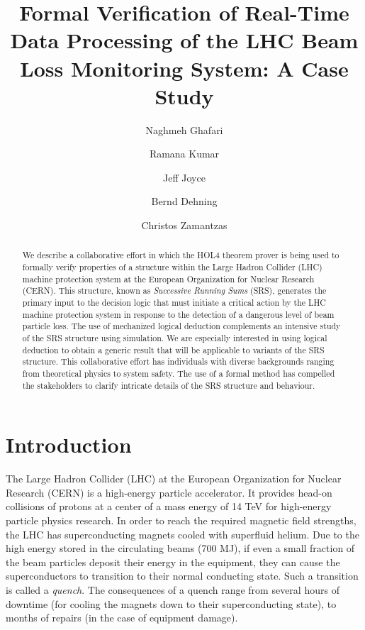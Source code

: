 \documentclass{llncs}
\begin{document}
\thispagestyle{empty}
\title{Formal Verification of Real-Time Data Processing of the LHC Beam Loss Monitoring System: A Case Study}
\author{Naghmeh Ghafari  \and Ramana Kumar  \and Jeff Joyce 
  \and Bernd Dehning  \and Christos Zamantzas  }

\pagestyle{plain}

\maketitle

\begin{abstract}

We describe a collaborative effort in which the HOL4 theorem prover is being used to formally verify properties of a structure within the Large Hadron Collider (LHC) machine protection system at the European Organization for Nuclear Research (CERN).
This structure, known as \emph{Successive Running Sums} (SRS), generates the primary input to the decision logic that must initiate a critical action by the LHC machine protection system in response to the detection of a dangerous level of beam particle loss.
The use of mechanized logical deduction complements an intensive study of the SRS structure using simulation.
We are especially interested in using logical deduction to obtain a generic result that will be applicable to variants of the SRS structure.
This collaborative effort has individuals with diverse backgrounds ranging from theoretical physics to system safety.
The use of a formal method has compelled the stakeholders to clarify intricate details of the SRS structure and behaviour.
\end{abstract}

\section{Introduction}

The Large Hadron Collider (LHC) at the European Organization for Nuclear Research (CERN) is a high-energy particle accelerator.
It provides head-on collisions of protons at a center of a mass energy of 14 TeV for high-energy particle physics research.
In order to reach the required magnetic field strengths, the LHC has superconducting magnets cooled with superfluid helium.
Due to the high energy stored in the circulating beams (700 MJ), if even a small fraction of the beam particles deposit their energy in the equipment, they can cause the superconductors to transition to their normal conducting state.
Such a transition is called a \emph{quench}.
The consequences of a quench range from several hours of downtime (for cooling the magnets down to their superconducting state), to months of repairs (in the case of equipment damage).
\end{document}
